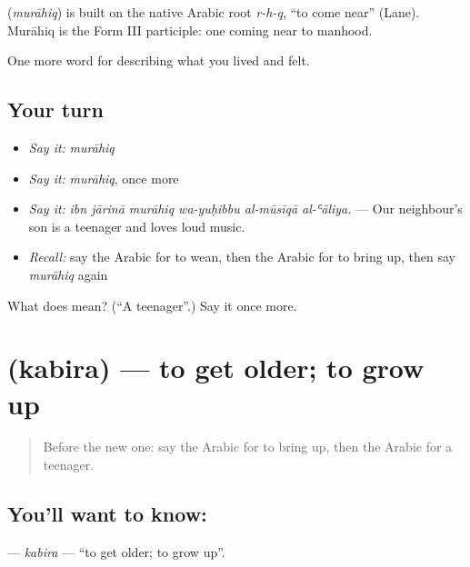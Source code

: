 \begin{cousinweb}
\textbf{} (\emph{murāhiq}) is built on the native Arabic root \emph{r-h-q}, \textquotedblleft{}to come near\textquotedblright{} (Lane). Murāhiq is the Form III participle: one coming near to manhood.
\end{cousinweb}

\begin{grammarlens}[title={What you've built}]
One more word for describing what you lived and felt.
\end{grammarlens}

\subsection*{Your turn}
\begin{itemize}
\raggedright
  \item \emph{Say it:} \emph{murāhiq}
  \item \emph{Say it:} \emph{murāhiq}, once more
  \item \emph{Say it:} \emph{ibn jārinā murāhiq wa-yuḥibbu al-mūsīqā al-ʿāliya.} — Our neighbour's son is a teenager and loves loud music.
  \item \emph{Recall:} say the Arabic for to wean, then the Arabic for to bring up, then say \emph{murāhiq} again
\end{itemize}

\begin{tcolorbox}[breakable,colback=teal!4,colframe=teal!35!black,title={Before you move on}]
What does  mean? (\textquotedblleft{}A teenager\textquotedblright{}.) Say it once more.
\end{tcolorbox}
\section[\texorpdfstring{\ar{كبر} (kabira)}{كبر (kabira)}]{ (kabira) — to get older; to grow up}

\label{lesson:AR-C531-kabira}



\begin{quote}
Before the new one: say the Arabic for to bring up, then the Arabic for a teenager.
\end{quote}

\subsection*{You'll want to know: }
\textbf{} — \emph{kabira} — \textquotedblleft{}to get older; to grow up\textquotedblright{}.

